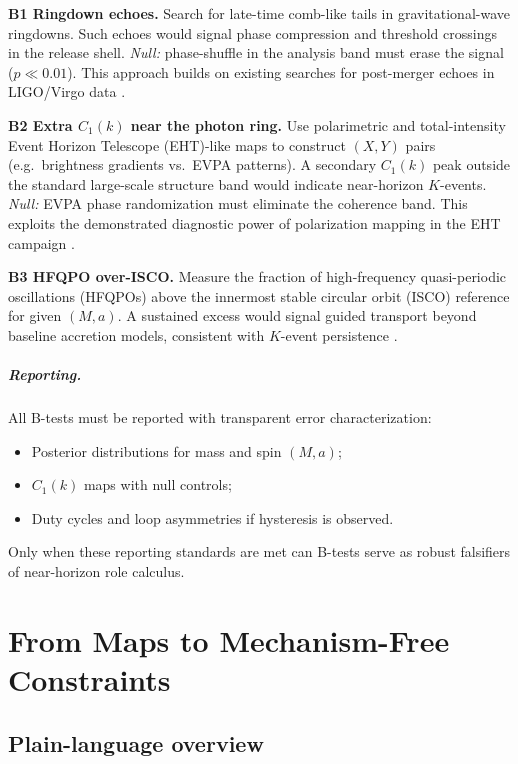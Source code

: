 \documentclass[12pt,a4paper,oneside]{scrreprt}
\begin{document}
\textbf{B1 Ringdown echoes.} 
Search for late-time comb-like tails in gravitational-wave ringdowns. 
Such echoes would signal phase compression and threshold crossings in the 
release shell. 
\emph{Null:} phase-shuffle in the analysis band must erase the signal 
($p \ll 0.01$). 
This approach builds on existing searches for post-merger echoes in 
LIGO/Virgo data \citep{Abedi2017Echoes,Cardoso2016Echoes}.

\textbf{B2 Extra $C_1(k)$ near the photon ring.} 
Use polarimetric and total-intensity Event Horizon Telescope (EHT)-like 
maps to construct $(X,Y)$ pairs (e.g.\ brightness gradients vs.\ EVPA patterns). 
A secondary $C_1(k)$ peak outside the standard large-scale structure band 
would indicate near-horizon $K$-events. 
\emph{Null:} EVPA phase randomization must eliminate the coherence band. 
This exploits the demonstrated diagnostic power of polarization mapping 
in the EHT campaign \citep{EventHorizonTelescope2021Polarization}.

\textbf{B3 HFQPO over-ISCO.} 
Measure the fraction of high-frequency quasi-periodic oscillations (HFQPOs) 
above the innermost stable circular orbit (ISCO) reference for given 
$(M,a)$. 
A sustained excess would signal guided transport beyond baseline accretion 
models, consistent with $K$-event persistence 
\citep{Remillard2006QPO,Ingram2019QPO}. 

\paragraph{Reporting.} 
All B-tests must be reported with transparent error characterization: 
\begin{itemize}
  \item Posterior distributions for mass and spin $(M,a)$; 
  \item $C_1(k)$ maps with null controls; 
  \item Duty cycles and loop asymmetries if hysteresis is observed. 
\end{itemize}
Only when these reporting standards are met can B-tests serve as 
robust falsifiers of near-horizon role calculus.

\chapter{From Maps to Mechanism-Free Constraints}\label{ch:cosmos-constraints}

\section*{Plain-language overview}
\end{document}
